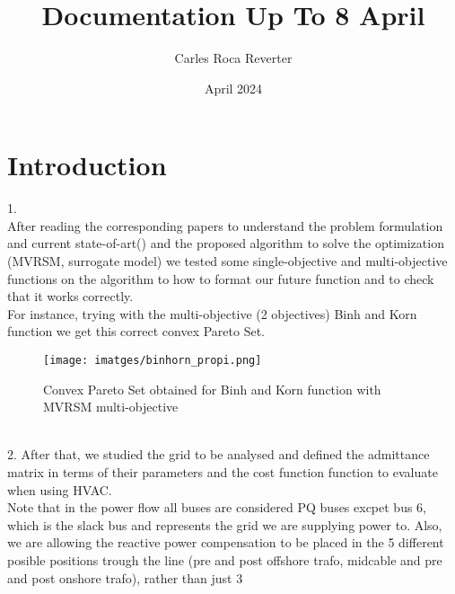 \documentclass{article}
\title{Documentation Up To 8 April}
\author{Carles Roca Reverter}
\date{April 2024}
\begin{document}
\maketitle

\section{Introduction}

1.\\
After reading the corresponding papers to understand the problem formulation and current state-of-art() and the proposed algorithm to solve the optimization (MVRSM, surrogate model) we tested some single-objective and multi-objective functions on the algorithm to how to format our future function and to check that it works correctly.\\
For instance, trying with the multi-objective (2 objectives) Binh and Korn function we get this correct convex Pareto Set.
\begin{figure}[h] %
	\centering
	\texttt{[image: imatges/binhorn\_propi.png]}
	\caption{Convex Pareto Set obtained for Binh and Korn function with MVRSM multi-objective}
	\label{fig:binhkorn} %
\end{figure}\\

2.  After that, we studied the grid to be analysed and defined the admittance matrix in terms of their parameters and the cost function function to evaluate when using HVAC.\\
Note that in the power flow all buses are considered PQ buses excpet bus 6, which is the slack bus and represents the grid we are supplying power to. Also, we are allowing the reactive power compensation to be placed in the 5 different posible positions trough the line (pre and post offshore trafo, midcable and pre and post onshore trafo), rather than just 3

\end{document}
